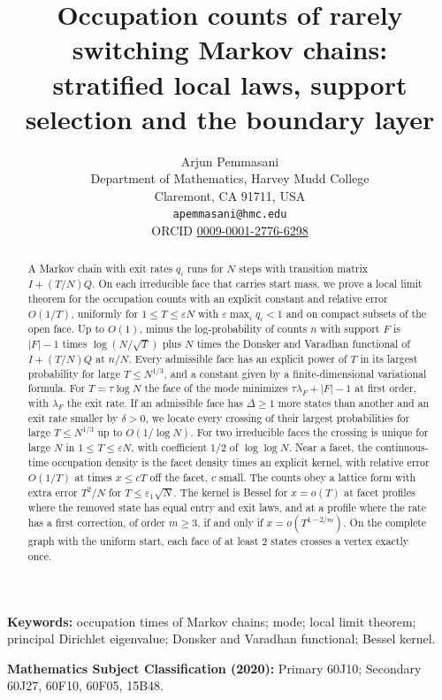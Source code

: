 \documentclass[11pt]{article}
\title{Occupation counts of rarely switching Markov chains:\\ stratified local laws, support selection and the boundary layer}
\author{Arjun Pemmasani\\[2pt]
\small Department of Mathematics, Harvey Mudd College\\
\small Claremont, CA 91711, USA\\
\small \texttt{apemmasani@hmc.edu}\\
\small ORCID \href{https://orcid.org/0009-0001-2776-6298}{0009-0001-2776-6298}}
\date{}
\theoremstyle{definition}
\theoremstyle{remark}
\begin{document}
\maketitle

\begin{abstract}
A Markov chain with exit rates $q_i$ runs for $N$ steps with transition matrix
$I+(T/N)Q$. On each irreducible face that carries start
mass, we prove a local limit theorem for the occupation counts with an
explicit constant and relative error $O(1/T)$, uniformly for $1\le
T\le\varepsilon N$ with $\varepsilon\max_iq_i<1$ and on compact subsets of the
open face. Up to $O(1)$, minus the log-probability of counts $n$ with support $F$ is
$|F|-1$ times $\log(N/\sqrt T)$ plus $N$ times the Donsker and Varadhan functional of $I+(T/N)Q$ at $n/N$. Every admissible face has an explicit power of $T$ in its largest
probability for large $T\le N^{1/3}$, and a constant given by a
finite-dimensional variational formula. For
$T=\tau\log N$ the face of the mode minimizes $\tau\lambda_F+|F|-1$ at first
order, with $\lambda_F$ the exit rate. If an admissible face has $\Delta\ge1$ more states than
another and an exit rate smaller by $\delta>0$, we locate every crossing of their largest
probabilities for large $T\le N^{1/3}$ up to $O(1/\log N)$. For two irreducible faces the crossing is
unique for large $N$ in $1\le T\le\varepsilon N$, with coefficient $1/2$ of $\log\log N$. Near a facet, the
continuous-time occupation density is the facet density times an explicit kernel, with relative
error $O(1/T)$ at times $x\le cT$ off the facet, $c$ small. The counts obey a lattice form with
extra error $T^2/N$ for $T\le\varepsilon_1\sqrt N$. The kernel is Bessel for $x=o(T)$ at facet profiles where the removed state has
equal entry and exit laws, and at a profile where the rate has a first correction, of order
$m\ge3$, if and only if $x=o(T^{1-2/m})$.
On the complete graph with the
uniform start, each face of at least 2 states crosses a vertex exactly once.
\end{abstract}

\medskip
\noindent\textbf{Keywords:} occupation times of Markov chains; mode; local
limit theorem; principal Dirichlet eigenvalue; Donsker and Varadhan
functional; Bessel kernel.

\noindent\textbf{Mathematics Subject Classification (2020):} Primary 60J10;
Secondary 60J27, 60F10, 60F05, 15B48.




\end{document}
